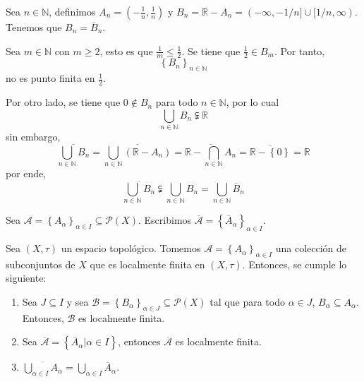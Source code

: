 \documentclass[12pt]{report}
\theoremstyle{largebreak}
\begin{document}
    \begin{exa}[\textbf{**}]
        Sea $n\in\mathbb{N}$, definimos $A_n=\left(-\frac{1}{n},\frac{1}{n}\right)$ y $B_n=\mathbb{R}-A_n=(-\infty,-1/n]\cup[1/n,\infty)$. Tenemos que $B_n=\overline{B}_n$.

        Sea $m\in\mathbb{N}$ con $m\geq 2$, esto es que $\frac{1}{m}\leq\frac{1}{2}$. Se tiene que $\frac{1}{2}\in B_m$. Por tanto,
        \begin{equation*}
            \left\{B_n\right\}_{n\in\mathbb{N}}
        \end{equation*}
        no es punto finita en $\frac{1}{2}$.

        Por otro lado, se tiene que $0\notin B_n$ para todo $n\in\mathbb{N}$, por lo cual
        \begin{equation*}
            \bigcup_{ n\in\mathbb{N}}B_n\subsetneqq \mathbb{R}
        \end{equation*}
        sin embargo,
        \begin{equation*}
            \overline{\bigcup_{ n\in\mathbb{N}}B_n}=\overline{\bigcup_{ n\in\mathbb{N}}(\mathbb{R}-A_n)}=\overline{\mathbb{R}-\bigcap_{ n\in\mathbb{N}}A_n}=\overline{\mathbb{R}-\left\{ 0\right\}}=\mathbb{R}
        \end{equation*}
        por ende,
        \begin{equation*}
            \overline{\bigcup_{ n\in\mathbb{N}}B_n}\subsetneqq \bigcup_{ n\in\mathbb{N}}B_n=\bigcup_{ n\in\mathbb{N}}\overline{B}_n
        \end{equation*}
    \end{exa}

    \begin{obs}
        Sea $\mathcal{A}=\left\{A_\alpha \right\}_{\alpha\in I}\subseteq\mathcal{P}(X)$. Escribimos $\overline{\mathcal{A}}=\left\{\overline{A}_\alpha \right\}_{\alpha\in I}$.
    \end{obs}

    \begin{propo}
        Sea $(X,\tau)$ un espacio topológico. Tomemos $\mathcal{A}=\left\{A_\alpha \right\}_{\alpha\in I}$ una colección de subconjuntos de $X$ que es localmente finita en $(X,\tau)$. Entonces, se cumple lo siguiente:
        \begin{enumerate}
            \item Sea $J\subseteq I$ y sea $\mathcal{B}=\left\{B_\alpha \right\}_{\alpha\in J}\subseteq\mathcal{P}(X)$ tal que para todo $\alpha\in J$, $B_\alpha\subseteq A_\alpha$. Entonces, $\mathcal{B}$ es localmente finita.
            \item Sea $\overline{\mathcal{A}}=\left\{\overline{A}_\alpha\Big|\alpha\in I \right\}$, entonces $\overline{\mathcal{A}}$ es localmente finita.
            \item $\overline{\bigcup_{\alpha\in I}A_\alpha}=\bigcup_{ \alpha\in I}\overline{A}_\alpha$.
        \end{enumerate}
    \end{propo}
\end{document}
